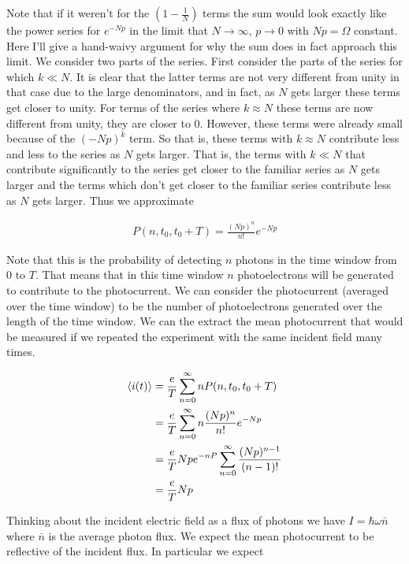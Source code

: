 \documentclass[12pt]{article}
\begin{document}
Note that if it weren't for the $\left(1-\frac{1}{N}\right)$ terms the sum would look exactly like the power series for $e^{-Np}$ in the limit that $N\rightarrow \infty$, $p \rightarrow 0$ with $Np = \Omega$ constant. Here I'll give a hand-waivy argument for why the sum does in fact approach this limit. We consider two parts of the series. First consider the parts of the series for which $k\ll N$. It is clear that the latter terms are not very different from unity in that case due to the large denominators, and in fact, as $N$ gets larger these terms get closer to unity. For terms of the series where $k \approx N$ these terms are now different from unity, they are closer to 0. However, these terms were already small because of the $(-Np)^k$ term. So that is, these terms with $k \approx N$ contribute less and less to the series as $N$ gets larger. That is, the terms with $k \ll N$ that contribute significantly to the series get closer to the familiar series as $N$ gets larger and the terms which don't get closer to the familiar series contribute less as $N$ gets larger. Thus we approximate

\begin{align}
P(n,t_0,t_0+T) = \frac{(Np)^n}{n!}e^{-Np}
\end{align}

Note that this is the probability of detecting $n$ photons in the time window from $0$ to $T$. That means that in this time window $n$ photoelectrons will be generated to contribute to the photocurrent. We can consider the photocurrent (averaged over the time window) to be the number of photoelectrons generated over the length of the time window. We can the extract the mean photocurrent that would be measured if we repeated the experiment with the same incident field many times.

\begin{align}
\Braket{i(t)} &= \frac{e}{T}\sum_{n=0}^{\infty} n P(n,t_0,t_0+T)\\
&= \frac{e}{T} \sum_{n=0}^{\infty} n \frac{(Np)^n}{n!} e^{-Np}\\
&= \frac{e}{T} Np e^{-nP} \sum_{n=0}^{\infty} \frac{(Np)^{n-1}}{(n-1)!}\\
&= \frac{e}{T} Np
\end{align}

Thinking about the incident electric field as a flux of photons we have $I = \hbar \omega \bar{n}$ where $\bar{n}$ is the average photon flux. We expect the mean photocurrent to be reflective of the incident flux. In particular we expect
\end{document}
